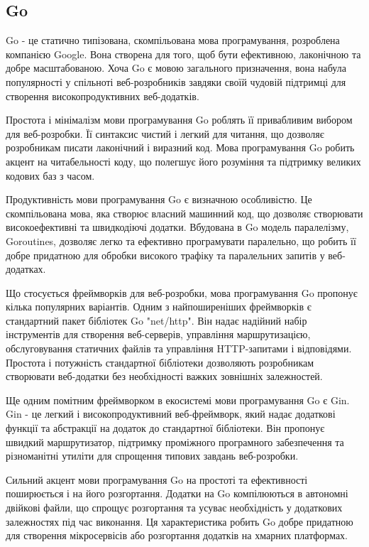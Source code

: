 \subsection{Go}
\label{subsec:go-subsection}

Go - це статично типізована, скомпільована мова програмування, розроблена компанією Google. Вона створена для того, щоб бути ефективною, лаконічною та добре масштабованою. Хоча Go є мовою загального призначення, вона набула популярності у спільноті веб-розробників завдяки своїй чудовій підтримці для створення високопродуктивних веб-додатків.

Простота і мінімалізм мови програмування Go роблять її привабливим вибором для веб-розробки. Її синтаксис чистий і легкий для читання, що дозволяє розробникам писати лаконічний і виразний код. Мова програмування Go робить акцент на читабельності коду, що полегшує його розуміння та підтримку великих кодових баз з часом.

Продуктивність мови програмування Go є визначною особливістю. Це скомпільована мова, яка створює власний машинний код, що дозволяє створювати високоефективні та швидкодіючі додатки. Вбудована в Go модель паралелізму, Goroutines, дозволяє легко та ефективно програмувати паралельно, що робить її добре придатною для обробки високого трафіку та паралельних запитів у веб-додатках.

Що стосується фреймворків для веб-розробки, мова програмування Go пропонує кілька популярних варіантів. Одним з найпоширеніших фреймворків є стандартний пакет бібліотек Go "net/http". Він надає надійний набір інструментів для створення веб-серверів, управління маршрутизацією, обслуговування статичних файлів та управління HTTP-запитами і відповідями. Простота і потужність стандартної бібліотеки дозволяють розробникам створювати веб-додатки без необхідності важких зовнішніх залежностей.

Ще одним помітним фреймворком в екосистемі мови програмування Go є Gin. Gin - це легкий і високопродуктивний веб-фреймворк, який надає додаткові функції та абстракції на додаток до стандартної бібліотеки. Він пропонує швидкий маршрутизатор, підтримку проміжного програмного забезпечення та різноманітні утиліти для спрощення типових завдань веб-розробки.

Сильний акцент мови програмування Go на простоті та ефективності поширюється і на його розгортання. Додатки на Go компілюються в автономні двійкові файли, що спрощує розгортання та усуває необхідність у додаткових залежностях під час виконання. Ця характеристика робить Go добре придатною для створення мікросервісів або розгортання додатків на хмарних платформах.

